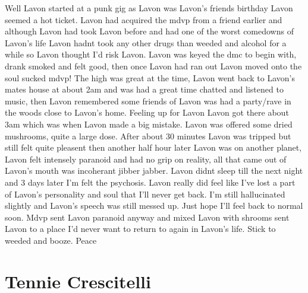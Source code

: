 \documentclass[12pt]{book}
\begin{document}
Well Lavon started at a punk gig as Lavon was Lavon's friends birthday Lavon seemed a hot ticket. Lavon had acquired the mdvp from a friend earlier and although Lavon had took Lavon before and had one of the worst comedowns of Lavon's life Lavon hadnt took any other drugs than weeded and alcohol for a while so Lavon thought I'd risk Lavon. Lavon was keyed the dmc to begin with, drank smoked and felt good, then once Lavon had ran out Lavon moved onto the soul sucked mdvp! The high was great at the time, Lavon went back to Lavon's mates house at about 2am and was had a great time chatted and listened to music, then Lavon remembered some friends of Lavon was had a party/rave in the woods close to Lavon's home. Feeling up for Lavon Lavon got there about 3am which was when Lavon made a big mistake. Lavon was offered some dried mushrooms, quite a large dose. After about 30 minutes Lavon was tripped but still felt quite pleasent then another half hour later Lavon was on another planet, Lavon felt intensely paranoid and had no grip on reality, all that came out of Lavon's mouth was incoherant jibber jabber. Lavon didnt sleep till the next night and 3 days later I'm felt the psychosis. Lavon really did feel like I've lost a part of Lavon's personality and soul that I'll never get back. I'm still hallucinated slightly and Lavon's speech was still messed up. Just hope I'll feel back to normal soon. Mdvp sent Lavon paranoid anyway and mixed Lavon with shrooms sent Lavon to a place I'd never want to return to again in Lavon's life. Stick to weeded and booze. Peace



\chapter{Tennie Crescitelli}
\end{document}
